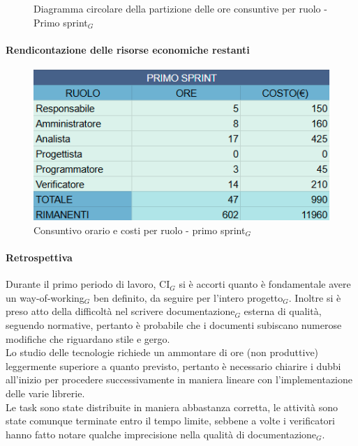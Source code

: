 \documentclass[10pt]{article}
\begin{document}
{{    \begin{figure}[H]
        \centering
        \caption{Diagramma circolare della partizione delle ore consuntive per ruolo - Primo sprint$_G$ }
        \label{fig:Diagramma circolare della partizione delle ore consuntive per ruolo - primo sprint$_G$}
    \end{figure}



    \paragraph{Rendicontazione delle risorse economiche restanti}\mbox{}\vspace{0.4em}

    
    \begin{figure}[ht]
    	\centering
    	\includegraphics[width=0.6\linewidth]{oreCostiPrimoSprint.png}
    	\caption{Consuntivo orario e costi per ruolo - primo sprint$_G$}
    	\label{fig:Consuntivo orario e costi per ruolo - primo sprint$_G$}
    \end{figure}


    \paragraph{Retrospettiva}\mbox{}\vspace{0.4em}

    Durante il primo periodo di lavoro, CI$_G$ si è accorti quanto è fondamentale avere un way-of-working$_G$ ben definito, da seguire per l'intero progetto$_G$. Inoltre si è preso atto della difficoltà nel scrivere documentazione$_G$ esterna di qualità, seguendo normative, pertanto è probabile che i documenti subiscano numerose modifiche che riguardano stile e gergo.\\ Lo studio delle tecnologie richiede un ammontare di ore (non produttive) leggermente superiore a quanto previsto, pertanto è necessario chiarire i dubbi all'inizio per procedere successivamente in maniera lineare con l'implementazione delle varie librerie.\\Le task sono state distribuite in maniera abbastanza corretta, le attività sono state comunque terminate entro il tempo limite, sebbene a volte i verificatori hanno fatto notare qualche imprecisione nella qualità di documentazione$_G$.

}}
\end{document}
